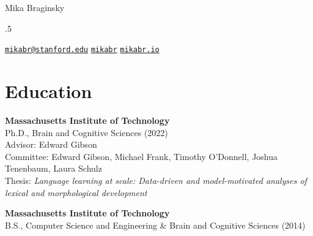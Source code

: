 \documentclass[11pt,]{article}
\begin{document}
\centerline{\huge Mika Braginsky}

\vspace{1.5 mm}

\footnotesize


\moveleft.5\hoffset\centerline{
      \scalebox{1.2}{\faEnvelope}\hspace{.5 mm}
    \href{mailto:}{\tt \href{mailto:mikabr@stanford.edu}{\nolinkurl{mikabr@stanford.edu}}} \hspace{2 mm}
        \scalebox{1.4}{\faGithub}\hspace{.5 mm}
    \href{http://github.com/mikabr}{\tt mikabr} \hspace{2 mm}
        \scalebox{1.2}{\faLink}\hspace{.5 mm}
    \href{http://mikabr.io}{\tt mikabr.io} \hspace{2 mm}
    }
\normalsize

\hypertarget{education}{%
\section{Education}\label{education}}

\textbf{Massachusetts Institute of Technology}\\
\hspace*{0.333em}\hspace*{0.333em}\hspace*{0.333em}Ph.D., Brain and
Cognitive Sciences (2022)\\
\hspace*{0.333em}\hspace*{0.333em}\hspace*{0.333em}Advisor: Edward
Gibson\\
\hspace*{0.333em}\hspace*{0.333em}\hspace*{0.333em}Committee: Edward
Gibson, Michael Frank, Timothy O'Donnell, Joshua Tenenbaum, Laura
Schulz\\
\hspace*{0.333em}\hspace*{0.333em}\hspace*{0.333em}Thesis:
\emph{Language learning at scale: Data-driven and model-motivated
analyses of lexical and morphological development}

\textbf{Massachusetts Institute of Technology}\\
\hspace*{0.333em}\hspace*{0.333em}\hspace*{0.333em}B.S., Computer
Science and Engineering \& Brain and Cognitive Sciences (2014)
\end{document}

